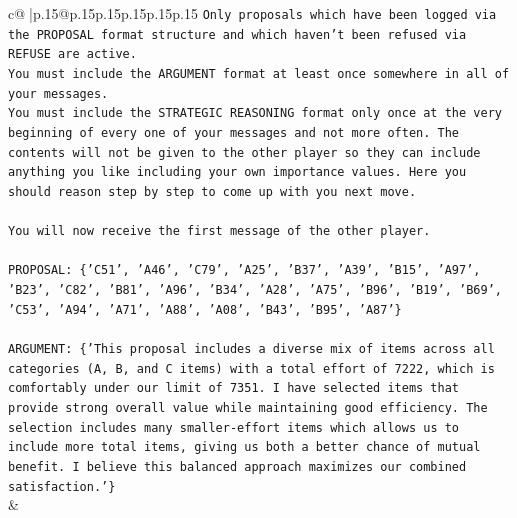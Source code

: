 \documentclass{article}
\begin{document}
{\begin{supertabular}{c@{$\;$}|p{.15\linewidth}@{}p{.15\linewidth}p{.15\linewidth}p{.15\linewidth}p{.15\linewidth}p{.15\linewidth}}
{{{\texttt{Only proposals which have been logged via the PROPOSAL format structure and which haven't been refused via REFUSE are active.} \\
\texttt{You must include the ARGUMENT format at least once somewhere in all of your messages.} \\
\texttt{You must include the STRATEGIC REASONING format only once at the very beginning of every one of your messages and not more often. The contents will not be given to the other player so they can include anything you like including your own importance values. Here you should reason step by step to come up with you next move.} \\
\\ 
\texttt{You will now receive the first message of the other player.} \\
\\ 
\texttt{PROPOSAL: \{'C51', 'A46', 'C79', 'A25', 'B37', 'A39', 'B15', 'A97', 'B23', 'C82', 'B81', 'A96', 'B34', 'A28', 'A75', 'B96', 'B19', 'B69', 'C53', 'A94', 'A71', 'A88', 'A08', 'B43', 'B95', 'A87'\}} \\
\\ 
\texttt{ARGUMENT: \{'This proposal includes a diverse mix of items across all categories (A, B, and C items) with a total effort of 7222, which is comfortably under our limit of 7351. I have selected items that provide strong overall value while maintaining good efficiency. The selection includes many smaller{-}effort items which allows us to include more total items, giving us both a better chance of mutual benefit. I believe this balanced approach maximizes our combined satisfaction.'\}} \\
            }
        }
    }
    & \\ \\


\end{supertabular}}
\end{document}
